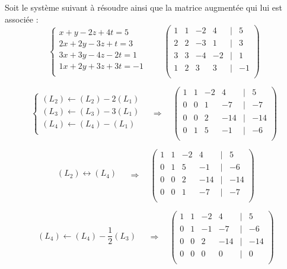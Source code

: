 \documentclass[10pt]{article}
\begin{document}
\begin{exemple}
Soit le système suivant à résoudre ainsi que la matrice augmentée qui lui est associée : 
$$
\left\{
\begin{array}{l}
x   + y  -2 z +4t = 5 \\
2x + 2y -3 z +t = 3 \\
3x + 3y -4 z -2t = 1 \\
1x + 2y +3 z +3t = -1 \\
\end{array}
\right.
\quad\quad
\begin{pmatrix}
1 & 1 & -2 & 4 & | & 5 \\
2 & 2 & -3 & 1 & | &  3 \\
3 & 3 & -4 &  -2& | & 1 \\
1 & 2 & 3 & 3 & | & -1 \\
\end{pmatrix}
$$

$$
\left\{
\begin{array}{l}
(L_2) \leftarrow (L_2) - 2 (L_1) \\ 
(L_3) \leftarrow (L_3) - 3 (L_1) \\
(L_4) \leftarrow (L_4) -  (L_1) \\
\end{array}
\right.
\quad\Longrightarrow \quad
\begin{pmatrix}
1 & 1 & -2 & 4 & | & 5 \\
0 & 0 & 1 & -7 & | &  -7 \\
0 & 0 & 2 &  -14& | & -14 \\
0 & 1 & 5 & -1 & | & -6 \\
\end{pmatrix}
$$

$$
\begin{array}{l}
(L_2) \leftrightarrow (L_4)  \\ 
\end{array}
\quad\Longrightarrow \quad
\begin{pmatrix}
1 & 1 & -2 & 4 & | & 5 \\
0 & 1 & 5 & -1 & | & -6 \\
0 & 0 & 2 &  -14& | & -14 \\
0 & 0 & 1 & -7 & | &  -7 \\
\end{pmatrix}
$$

$$
\begin{array}{l}
(L_4) \leftarrow (L_4) - \dfrac{1}{2} (L_3)\\ 
\end{array}
\quad\Longrightarrow \quad
\begin{pmatrix}
1 & 1 & -2 & 4 & | & 5 \\
0 & 1 & -1 & -7 & | & -6 \\
0 & 0 & 2 &  -14& | & -14 \\
0 & 0 & 0 & 0 & | &  0 \\
\end{pmatrix}
$$
\end{exemple}
\end{document}
